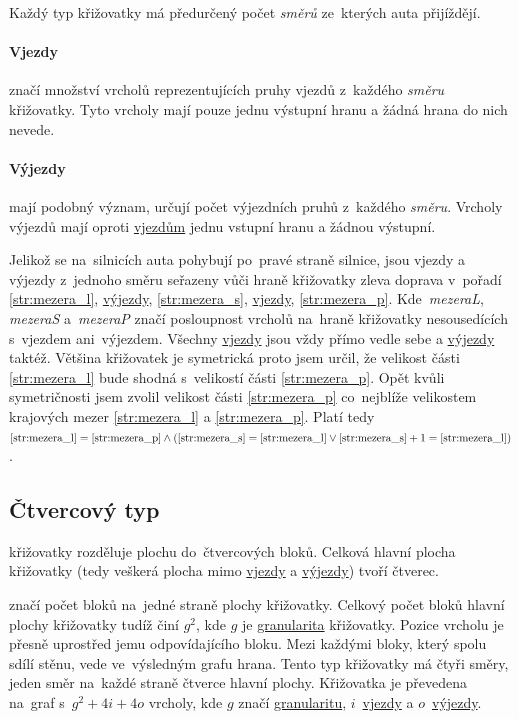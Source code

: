 Každý typ křižovatky má předurčený počet \emph{směrů} ze~kterých auta přijíždějí.

\paragraph{Vjezdy}\label{par:vjezdy} značí množství vrcholů reprezentujících pruhy vjezdů z~každého \emph{směru} křižovatky.
Tyto vrcholy mají pouze jednu výstupní hranu a žádná hrana do nich nevede.

\paragraph{Výjezdy}\label{par:vyjezdy} mají podobný význam, určují počet výjezdních pruhů z~každého \emph{směru}.
Vrcholy výjezdů mají oproti \hyperref[par:vjezdy]{vjezdům} jednu vstupní hranu a žádnou výstupní.

Jelikož se na~silnicích auta pohybují po~pravé straně silnice,
jsou vjezdy a výjezdy z~jednoho směru seřazeny vůči hraně křižovatky zleva doprava v~pořadí
\ref{str:mezera_l}, \hyperref[par:vyjezdy]{výjezdy}, \ref{str:mezera_s}, \hyperref[par:vyjezdy]{vjezdy}, \ref{str:mezera_p}.
Kde~\emph{mezeraL}, \emph{mezeraS}
a~\emph{mezeraP} značí posloupnost vrcholů na~hraně křižovatky
nesousedících s~vjezdem ani~výjezdem.
Všechny \hyperref[par:vjezdy]{vjezdy} jsou vždy přímo vedle sebe a \hyperref[par:vyjezdy]{výjezdy} taktéž.
Většina křižovatek je symetrická proto jsem určil, že velikost části \ref{str:mezera_l} bude shodná s~velikostí části \ref{str:mezera_p}.
Opět kvůli symetričnosti jsem zvolil velikost části \ref{str:mezera_p} co~nejblíže velikostem
krajových mezer \ref{str:mezera_l} a \ref{str:mezera_p}.
Platí tedy $\ref{str:mezera_l}=\ref{str:mezera_p}\wedge(\ref{str:mezera_s}=\ref{str:mezera_l}\vee\ref{str:mezera_s}+1=\ref{str:mezera_l})$.

\subsection{Čtvercový typ}\label{subsec:ctvercovy_typ}

 křižovatky rozděluje plochu do~čtvercových bloků.
Celková hlavní plocha křižovatky (tedy veškerá plocha mimo
\hyperref[par:vjezdy]{vjezdy} a \hyperref[par:vyjezdy]{výjezdy}) tvoří čtverec.

 značí počet bloků na~jedné straně plochy křižovatky.
Celkový počet bloků hlavní plochy křižovatky tudíž činí $g^2$, kde $g$ je \hyperref[par:granularita]{granularita} křižovatky.
Pozice vrcholu je přesně uprostřed jemu odpovídajícího bloku.
Mezi každými bloky, který spolu sdílí stěnu, vede ve~výsledným grafu hrana.
Tento typ křižovatky má čtyři směry, jeden směr na~každé straně čtverce hlavní plochy.
Křižovatka je převedena na~graf s~$g^2 + 4i + 4o$ vrcholy,
kde $g$ značí \hyperref[par:granularita]{granularitu}, $i$~\hyperref[par:vjezdy]{vjezdy} a $o$~\hyperref[par:vyjezdy]{výjezdy}.

